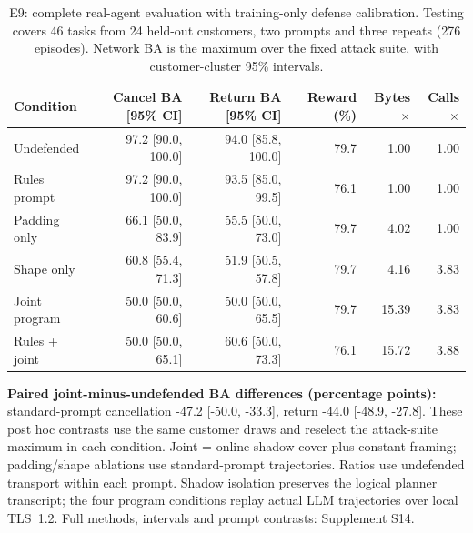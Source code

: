 \begin{table}[t]\centering\small
\caption{E9: complete real-agent evaluation with training-only defense calibration. Testing covers 46 tasks from 24 held-out customers, two prompts and three repeats (276 episodes). Network BA is the maximum over the fixed attack suite, with customer-cluster 95\% intervals.}\label{tab:r4-primary}
\begin{tabular}{@{}lrrrrr@{}}\toprule
Condition & Cancel BA [95\% CI] & Return BA [95\% CI] & Reward (\%) & Bytes$\times$ & Calls$\times$\\\midrule
Undefended & 97.2 [90.0, 100.0] & 94.0 [85.8, 100.0] & 79.7 & 1.00 & 1.00\\
Rules prompt & 97.2 [90.0, 100.0] & 93.5 [85.0, 99.5] & 76.1 & 1.00 & 1.00\\
Padding only & 66.1 [50.0, 83.9] & 55.5 [50.0, 73.0] & 79.7 & 4.02 & 1.00\\
Shape only & 60.8 [55.4, 71.3] & 51.9 [50.5, 57.8] & 79.7 & 4.16 & 3.83\\
Joint program & 50.0 [50.0, 60.6] & 50.0 [50.0, 65.5] & 79.7 & 15.39 & 3.83\\
Rules + joint & 50.0 [50.0, 65.1] & 60.6 [50.0, 73.3] & 76.1 & 15.72 & 3.88\\
\bottomrule\end{tabular}
\par\smallskip\raggedright \textbf{Paired joint-minus-undefended BA differences (percentage points):} standard-prompt cancellation -47.2 [-50.0, -33.3], return -44.0 [-48.9, -27.8]. These post hoc contrasts use the same customer draws and reselect the attack-suite maximum in each condition. Joint = online shadow cover plus constant framing; padding/shape ablations use standard-prompt trajectories. Ratios use undefended transport within each prompt. Shadow isolation preserves the logical planner transcript; the four program conditions replay actual LLM trajectories over local TLS~1.2. Full methods, intervals and prompt contrasts: Supplement S14.
\end{table}
